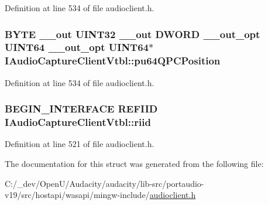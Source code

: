 Definition at line 534 of file audioclient.\+h.

\subsubsection[{\texorpdfstring{pu64\+Q\+P\+C\+Position}{pu64QPCPosition}}]{ {\bf B\+Y\+TE} {\bf \+\_\+\+\_\+out} U\+I\+N\+T32 {\bf \+\_\+\+\_\+out} {\bf D\+W\+O\+RD} {\bf \+\_\+\+\_\+out\+\_\+opt} U\+I\+N\+T64 {\bf \+\_\+\+\_\+out\+\_\+opt} U\+I\+N\+T64$\ast$ I\+Audio\+Capture\+Client\+Vtbl\+::pu64\+Q\+P\+C\+Position}\hypertarget{struct_i_audio_capture_client_vtbl_a32c29c256ece73be059a20674ffccac7}{}\label{struct_i_audio_capture_client_vtbl_a32c29c256ece73be059a20674ffccac7}


Definition at line 534 of file audioclient.\+h.

\subsubsection[{\texorpdfstring{riid}{riid}}]{\setlength{\rightskip}{0pt plus 5cm}B\+E\+G\+I\+N\+\_\+\+I\+N\+T\+E\+R\+F\+A\+CE {\bf R\+E\+F\+I\+ID} I\+Audio\+Capture\+Client\+Vtbl\+::riid}\hypertarget{struct_i_audio_capture_client_vtbl_adde7dcf4e05e090fe9b06821531edd4f}{}\label{struct_i_audio_capture_client_vtbl_adde7dcf4e05e090fe9b06821531edd4f}


Definition at line 521 of file audioclient.\+h.



The documentation for this struct was generated from the following file\+:\begin{DoxyCompactItemize}
\item 
C\+:/\+\_\+dev/\+Open\+U/\+Audacity/audacity/lib-\/src/portaudio-\/v19/src/hostapi/wasapi/mingw-\/include/\hyperlink{audioclient_8h}{audioclient.\+h}\end{DoxyCompactItemize}
